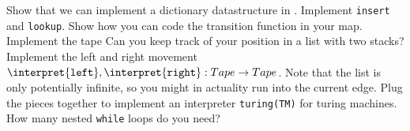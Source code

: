 \begin{Exercise}[title={Interpreter for \TM},label={exc:tm},difficulty=2]
	\Question Show that we can implement a dictionary datastructure in \WHILE\@.
		Implement {\tt insert} and {\tt lookup}.
	\Question Show how you can code the transition function in your map.
	\Question Implement the tape
		\subQuestion Can you keep track of your position in a list with two stacks?
		\subQuestion Implement the left and right movement 
		$\interpret{{\tt left}},\interpret{{\tt right}} : Tape \rightarrow Tape$. Note that the list is 
			only potentially infinite, so you might in actuality run into the current edge.
	\Question Plug the pieces together to implement an interpreter {\tt turing(TM)} for turing machines.
		\subQuestion How many nested {\tt while} loops do you need?
\end{Exercise}
